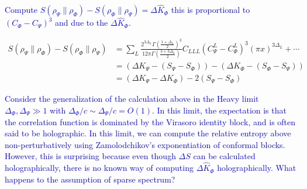 \documentclass[11pt]{article}
\newcommand{\p}{\partial}
\newcommand{\nn}{\nonumber}
\newcommand{\lb}{\left(}
\newcommand{\rb}{\right)}
\newcommand{\NL}[1]{\textcolor{blue}{#1}}
\begin{document}

\NL{Compute $S(\rho_\Psi\|\rho_\Phi)-S(\rho_\Phi\|\rho_\Psi)=\Delta \hat{K}_\Phi$ this is proportional to $(C_\Phi-C_\Psi)^3$ and due to the $\Delta \hat{K}_\Phi$.}

\begin{align}
    S(\rho_\Psi \|\rho_\Phi) -S(\rho_\Phi \|\rho_\Psi)   
    &=\sum_L \frac{2^{3\Delta_L}\Gamma \lb\frac{1+\Delta_L}{2}\rb^3}{12\pi \Gamma\lb\frac{3+3\Delta_L}{2}\rb}C_{LLL}(C^L_{\Psi} - C^L_{\Phi})^3(\pi x)^{3\Delta_L} +\cdots \\
    &=\lb \Delta K_\Psi - (S_\Psi - S_\Phi) \rb - \lb \Delta K_\Phi - (S_\Phi - S_\Psi) \rb
    \\
    &= \lb \Delta K_\Psi - \Delta K_\Phi \rb -2 \lb S_\Psi - S_\Phi\rb
\end{align}


\NL{Consider the generalization of the calculation above in the Heavy limit $\Delta_\Phi, \Delta_\Psi\gg 1$ with $\Delta_\Phi/c\sim \Delta_\Psi/c=O(1)$. In this limit, the expectation is that the correlation function is dominated by the Virasoro identity block, and is often said to be holographic. In this limit, we can compute the relative entropy above non-perturbatively using Zamolodchikov's exponentiation of conformal blocks. However, this is surprising because even though $\Delta S$ can be calculated holographically, there is no known way of computing $\Delta \hat{K}_\Phi$ holographically. What happens to the assumption of sparse spectrum?}
\end{document}
